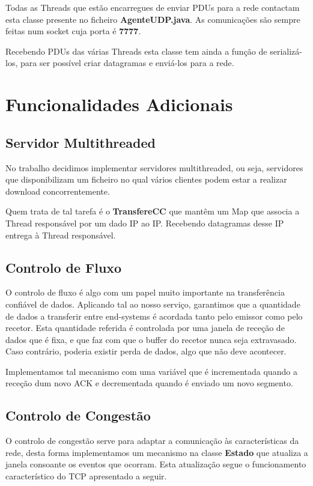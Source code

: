 \documentclass{llncs}
\begin{document}
Todas as Threads que estão encarregues de enviar PDUs para a rede contactam esta classe presente no ficheiro \textbf{AgenteUDP.java}. As comunicações são sempre feitas num socket cuja porta é \textbf{7777}.

Recebendo PDUs das várias Threads esta classe tem ainda a função de serializá-los, para ser possível criar datagramas e enviá-los para a rede.


\section{Funcionalidades Adicionais}

\subsection{Servidor Multithreaded}

No trabalho decidimos implementar servidores multithreaded, ou seja, servidores que disponibilizam um ficheiro no qual vários clientes podem estar a realizar download concorrentemente.

Quem trata de tal tarefa é o \textbf{TransfereCC} que mantêm um Map que associa a Thread responsável por um dado IP ao IP.
Recebendo datagramas desse IP entrega à Thread responsável.

\subsection{Controlo de Fluxo}

O controlo de fluxo é algo com um papel muito importante na transferência confiável de dados. Aplicando tal ao nosso serviço, garantimos que a quantidade de dados a transferir entre end-systems é acordada tanto pelo emissor como pelo recetor. Esta quantidade referida é controlada por uma janela de receção de dados que é fixa, e que faz com que o buffer do recetor nunca seja extravasado. Caso contrário, poderia existir perda de dados, algo que não deve acontecer.

Implementamos tal mecanismo com uma variável que é incrementada quando a receção dum novo ACK e decrementada quando é enviado um novo segmento.

\subsection{Controlo de Congestão}

O controlo de congestão serve para adaptar a comunicação às características da rede, desta forma implementamos um mecanismo na classe \textbf{Estado} que atualiza a janela consoante os eventos que ocorram. Esta atualização segue o funcionamento característico do TCP apresentado a seguir.
\end{document}
